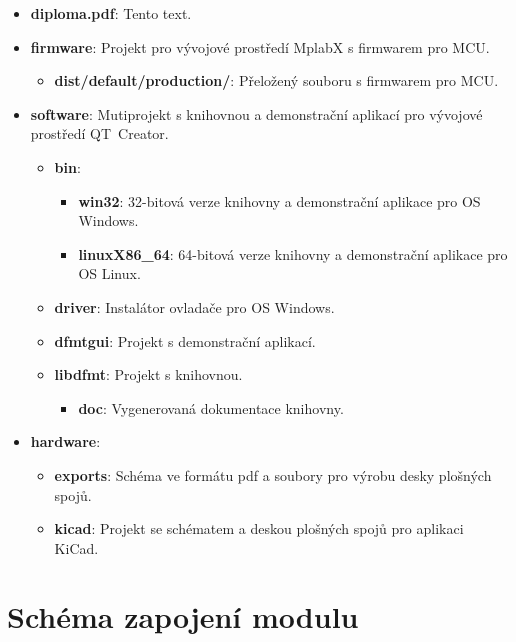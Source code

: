 \documentclass[czech,master,public,dept460,male,cpdeclaration]{diploma}	%
\begin{document}
\begin{itemize}
\item \textbf{diploma.pdf}: Tento text.

\item \textbf{firmware}: Projekt pro vývojové prostředí MplabX s firmwarem pro MCU.
	\begin{itemize}
	\item \textbf{dist/default/production/}: Přeložený souboru s firmwarem pro MCU.
	\end{itemize}

\item \textbf{software}: Mutiprojekt s knihovnou a demonstrační aplikací pro vývojové prostředí QT~Creator.
	\begin{itemize}
	\item \textbf{bin}:
		\begin{itemize}
		\item \textbf{win32}: 32-bitová verze knihovny a demonstrační aplikace pro OS Windows.
		\item \textbf{linuxX86\_64}: 64-bitová verze knihovny a demonstrační aplikace pro OS Linux.
		\end{itemize}
	\item \textbf{driver}: Instalátor ovladače pro OS Windows.
	\item \textbf{dfmtgui}: Projekt s demonstrační aplikací.
	\item \textbf{libdfmt}: Projekt s knihovnou.
	\begin{itemize}
		\item \textbf{doc}: Vygenerovaná dokumentace knihovny.
		\end{itemize}
	\end{itemize}
	
\item \textbf{hardware}:
	\begin{itemize}
	\item \textbf{exports}: Schéma ve formátu pdf a soubory pro výrobu desky plošných spojů.
	\item \textbf{kicad}: Projekt se schématem a deskou plošných spojů pro aplikaci KiCad.
	\end{itemize}



\end{itemize}


\section{Schéma zapojení modulu}
\label{sec:ap-schema}
\end{document}
